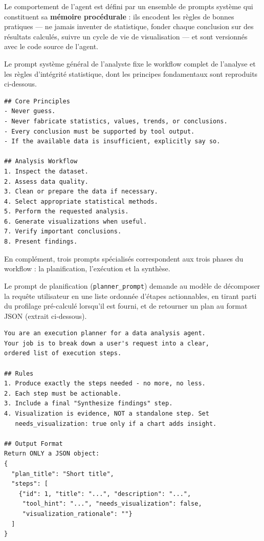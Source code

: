 Le comportement de l'agent est défini par un ensemble de prompts système qui constituent sa \textbf{mémoire procédurale} : ils encodent les règles de bonnes pratiques — ne jamais inventer de statistique, fonder chaque conclusion sur des résultats calculés, suivre un cycle de vie de visualisation — et sont versionnés avec le code source de l'agent.

Le prompt système général de l'analyste fixe le workflow complet de l'analyse et les règles d'intégrité statistique, dont les principes fondamentaux sont reproduits ci-dessous.

\begin{lstlisting}[caption={Prompt système de l'analyste (extrait)}]
## Core Principles
- Never guess.
- Never fabricate statistics, values, trends, or conclusions.
- Every conclusion must be supported by tool output.
- If the available data is insufficient, explicitly say so.

## Analysis Workflow
1. Inspect the dataset.
2. Assess data quality.
3. Clean or prepare the data if necessary.
4. Select appropriate statistical methods.
5. Perform the requested analysis.
6. Generate visualizations when useful.
7. Verify important conclusions.
8. Present findings.
\end{lstlisting}

En complément, trois prompts spécialisés correspondent aux trois phases du workflow : la planification, l'exécution et la synthèse.

Le prompt de planification (\texttt{planner\_prompt}) demande au modèle de décomposer la requête utilisateur en une liste ordonnée d'étapes actionnables, en tirant parti du profilage pré-calculé lorsqu'il est fourni, et de retourner un plan au format JSON (extrait ci-dessous).

\begin{lstlisting}[caption={Prompt de planification (extrait)}]
You are an execution planner for a data analysis agent.
Your job is to break down a user's request into a clear,
ordered list of execution steps.

## Rules
1. Produce exactly the steps needed - no more, no less.
2. Each step must be actionable.
3. Include a final "Synthesize findings" step.
4. Visualization is evidence, NOT a standalone step. Set
   needs_visualization: true only if a chart adds insight.

## Output Format
Return ONLY a JSON object:
{
  "plan_title": "Short title",
  "steps": [
    {"id": 1, "title": "...", "description": "...",
     "tool_hint": "...", "needs_visualization": false,
     "visualization_rationale": ""}
  ]
}
\end{lstlisting}

